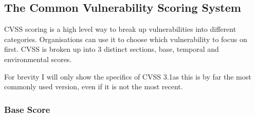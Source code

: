 \documentclass[12pt]{article}
\begin{document}
\subsection*{The Common Vulnerability Scoring System}

CVSS scoring is a high level way to break up vulnerabilities into different categories.
Organisations can use it to choose which vulnerability to focus on first. CVSS is broken up into 3
distinct sections, base, temporal and environmental scores.

For brevity I will only show the specifics of CVSS 3.1\cite{CVSS_31}as this is by far the most commonly used
version, even if it is not the most recent.

\subsubsection*{Base Score}
\end{document}
